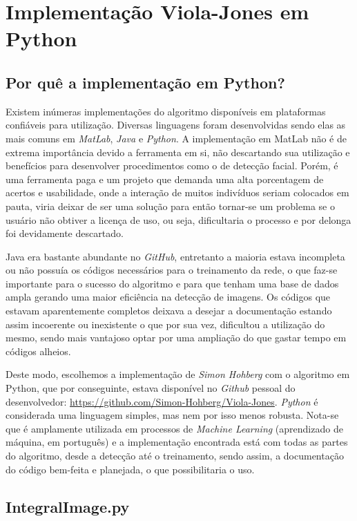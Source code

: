 \documentclass[12pt,a4paper]{article}
\begin{document}
\section{Implementação Viola-Jones em Python}

\subsection{Por quê a implementação em Python?}
Existem inúmeras implementações do algoritmo disponíveis em plataformas confiáveis para utilização. Diversas linguagens foram desenvolvidas sendo elas as mais comuns em \textit{MatLab}, \textit{Java} e \textit{Python}. A implementação em MatLab não é de extrema importância devido a ferramenta em si, não descartando sua utilização e benefícios para desenvolver procedimentos como o de detecção facial. Porém, é uma ferramenta paga e um projeto que demanda uma alta porcentagem de acertos e usabilidade, onde a interação de muitos indivíduos seriam colocados em pauta, viria deixar de ser uma solução para então tornar-se um problema se o usuário não obtiver a licença de uso, ou seja, dificultaria o processo e por delonga foi devidamente descartado.  

Java era bastante abundante no \textit{GitHub}, entretanto a maioria estava incompleta ou não possuía os códigos necessários para o treinamento da rede, o que faz-se importante para o sucesso do algoritmo e para que tenham uma base de dados ampla gerando uma maior eficiência na detecção de imagens. Os códigos que estavam aparentemente completos deixava a desejar a documentação estando assim incoerente ou inexistente o que por sua vez, dificultou a utilização do mesmo, sendo mais vantajoso optar por uma ampliação do que gastar tempo em códigos alheios. 


Deste modo, escolhemos a implementação de \textit{Simon Hohberg} com o algoritmo em Python,
que por conseguinte, estava disponível no \textit{Github} pessoal do desenvolvedor:
\url{https://github.com/Simon-Hohberg/Viola-Jones}. \textit{Python} é considerada uma linguagem simples, mas nem por isso menos robusta. Nota-se que é amplamente utilizada em processos de \textit{Machine Learning} (aprendizado de máquina, em português) e a implementação encontrada está com todas as partes do algoritmo, desde a detecção até o treinamento, sendo assim, a documentação do código
bem-feita e planejada, o que possibilitaria o uso. 



\subsection{IntegralImage.py}
\end{document}
